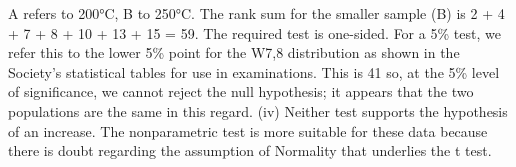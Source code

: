 \documentclass[a4paper,12pt]{article}
\begin{document}
\begin{enumerate}
\begin{center}
\begin{tabular}{c|c|c}
\end{tabular}
\end{center}

A refers to 200°C, B to 250°C.
The rank sum for the smaller sample (B) is 2 + 4 + 7 + 8 + 10 + 13 + 15 = 59.
The required test is one-sided. For a 5\% test, we refer this to the lower 5\% point for the W7,8 distribution as shown in the Society's statistical tables for use in examinations. This is 41 so, at the 5\% level of significance, we cannot reject the null hypothesis; it appears that the two populations are the same in this regard.
(iv) Neither test supports the hypothesis of an increase. The nonparametric test is more suitable for these data because there is doubt regarding the assumption of Normality that underlies the t test.
 \end{enumerate}
 
\end{document}
